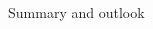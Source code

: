\documentclass{ikpKoeln}
\begin{document}
\begin{frame}[t]{Summary and outlook}
\begin{columns}[t]
\begin{column}{0.45 \textwidth}
\begin{figure}
			\end{figure}
		\end{column}
	\end{columns}
\end{frame}
\end{document}
